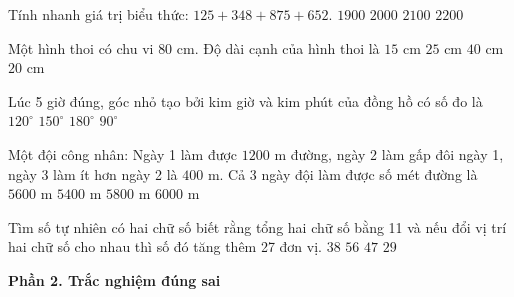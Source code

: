\begin{ex} %
Tính nhanh giá trị biểu thức: $125 + 348 + 875 + 652$.
\choice
{$1900$}
{\True $2000$}
{$2100$}
{$2200$}
\end{ex}

\begin{ex} %
Một hình thoi có chu vi $80\text{ cm}$. Độ dài cạnh của hình thoi là
\choice
{$15\text{ cm}$}
{$25\text{ cm}$}
{$40\text{ cm}$}
{\True $20\text{ cm}$}
\end{ex}

\begin{ex} %
Lúc 5 giờ đúng, góc nhỏ tạo bởi kim giờ và kim phút của đồng hồ có số đo là
\choice
{$120^\circ$}
{\True $150^\circ$}
{$180^\circ$}
{$90^\circ$}
\end{ex}

\begin{ex} %
Một đội công nhân: Ngày 1 làm được $1200\text{ m}$ đường, ngày 2 làm gấp đôi ngày 1, ngày 3 làm ít hơn ngày 2 là $400\text{ m}$. Cả 3 ngày đội làm được số mét đường là
\choice
{\True $5600\text{ m}$}
{$5400\text{ m}$}
{$5800\text{ m}$}
{$6000\text{ m}$}
\end{ex}

\begin{ex} %
Tìm số tự nhiên có hai chữ số biết rằng tổng hai chữ số bằng 11 và nếu đổi vị trí hai chữ số cho nhau thì số đó tăng thêm 27 đơn vị.
\choice
{$38$}
{$56$}
{\True $47$}
{$29$}
\end{ex}

\textbf{Phần 2. Trắc nghiệm đúng sai}

